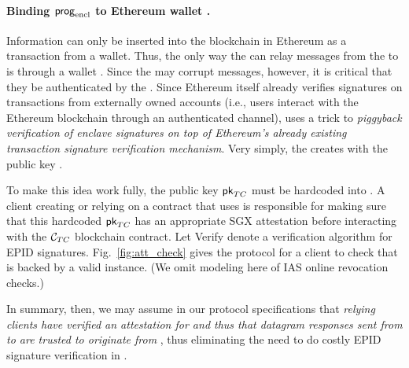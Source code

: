 \paragraph{Binding ${\sf prog}_{\textrm{encl}}$ to Ethereum wallet \tcadd.}
Information can only be inserted into the blockchain in Ethereum as a transaction from a wallet.
Thus, the only way the \medname can relay messages from the \encname to \tcont is through a wallet \tcadd.
Since the \medname may corrupt messages, however, it is critical that they be authenticated by the \encname.
Since Ethereum itself already verifies signatures on transactions from externally owned accounts
(i.e., users interact with the  Ethereum blockchain through an authenticated channel),
\tc uses a trick to {\it piggyback verification of enclave signatures on top of Ethereum's already existing transaction signature verification mechanism}. 
Very simply, the \encname creates \tcadd with the public key \pkTC. 

To make this idea work fully, the public key ${\sf pk}_{TC}$ must be hardcoded into \tcont. A client creating or relying on a contract that uses \tcont is responsible for making sure that this hardcoded ${\sf pk}_{TC}$ has an appropriate SGX attestation before interacting with the $\tcont$  blockchain contract.  Let {\sf Verify} denote a verification algorithm for EPID signatures. Fig.~\ref{fig:att_check} gives the protocol for a client to check that \tcont is backed by a valid \encname instance. (We omit modeling here of IAS online revocation checks.)


In summary, then, we may assume in our protocol specifications that {\em relying clients have verified an attestation for \encname and thus that datagram responses sent from \tcadd to \tcont are trusted to originate from \engine}, thus eliminating the need to do costly EPID signature verification in \tcont.



